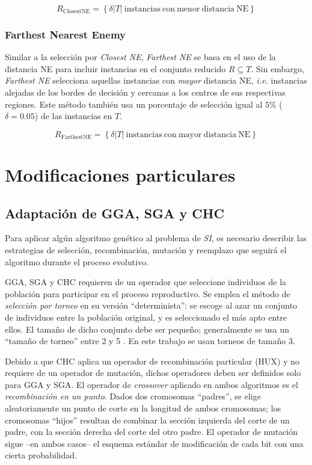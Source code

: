 \begin{equation}
R_\mathrm{ClosestNE} = \left\lbrace \delta \vert T \vert\ \mathrm{instancias\ con\ menor\ distancia\ NE} \right\rbrace
\end{equation}

\subsubsection{Farthest Nearest Enemy}

Similar a la selección por \emph{Closest NE}, \emph{Farthest NE} se basa en el uso de la distancia NE para incluir instancias en el conjunto reducido $R \subseteq T$. Sin embargo, \emph{Farthest NE} selecciona aquellas instancias con \emph{mayor} distancia NE, \emph{i.e.} instancias alejadas de los bordes de decisión y cercanas a los centros de sus respectivas regiones. Este método también usa un porcentaje de selección igual al $5\%$ ($\delta = 0.05$) de las instancias en $T$.

\begin{equation}
R_\mathrm{FarthestNE} = \left\lbrace \delta \vert T \vert\ \mathrm{instancias\ con\ mayor\ distancia\ NE} \right\rbrace
\end{equation}

\section{Modificaciones particulares}

\subsection{Adaptación de GGA, SGA y CHC}

Para aplicar algún algoritmo genético al problema de \emph{SI}, es necesario describir las estrategias de selección, recombinación, mutación y reemplazo que seguirá el algoritmo durante el proceso evolutivo.

GGA, SGA y CHC requieren de un operador que seleccione individuos de la población para participar en el proceso reproductivo. Se emplea el método de \emph{selección por torneo} en su versión ``determinista'': se escoge al azar un conjunto de individuos entre la población original, y es seleccionado el más apto entre ellos. El tamaño de dicho conjunto debe ser pequeño; generalmente se usa un ``tamaño de torneo'' entre 2 y 5 \cite{Miller95geneticalgorithms}. En este trabajo se usan torneos de tamaño 3.

Debido a que CHC aplica un operador de recombinación particular (HUX) y no requiere de un operador de mutación, dichos operadores deben ser definidos solo para GGA y SGA. El operador de \emph{crossover} aplicado en ambos algoritmos es el \emph{recombinación en un punto}. Dados dos cromosomas ``padres'', se elige aleatoriamente un punto de corte en la longitud de ambos cromosomas; los cromosomas ``hijos'' resultan de combinar la sección izquierda del corte de un padre, con la sección derecha del corte del otro padre. El operador de mutación sigue --en ambos casos-- el esquema estándar de modificación de cada bit con una cierta probabilidad.

